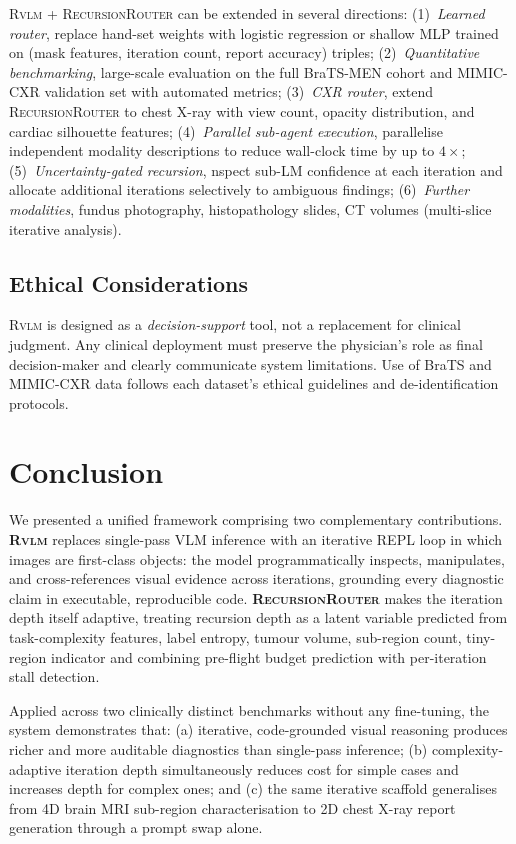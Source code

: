 \documentclass{article}
\newcommand{\RVLM}{\textsc{Rvlm}}
\newcommand{\RRouter}{\textsc{RecursionRouter}}
\begin{document}
	\RVLM{} + \RRouter{} can be extended in several directions:
	(1)~\emph{Learned router}, replace hand-set weights with logistic
	regression or shallow MLP trained on (mask features, iteration count, report
	accuracy) triples;
	(2)~\emph{Quantitative benchmarking}, large-scale evaluation on the full
	BraTS-MEN cohort and MIMIC-CXR validation set with automated metrics;
	(3)~\emph{CXR router}, extend \RRouter{} to chest X-ray with view count,
	opacity distribution, and cardiac silhouette features;
	(4)~\emph{Parallel sub-agent execution}, parallelise independent modality
	descriptions to reduce wall-clock time by up to $4\times$;
	(5)~\emph{Uncertainty-gated recursion}, nspect sub-LM confidence at each
	iteration and allocate additional iterations selectively to ambiguous findings;
	(6)~\emph{Further modalities}, fundus photography, histopathology slides,
	CT volumes (multi-slice iterative analysis).
	
	\subsection{Ethical Considerations}
	
	\RVLM{} is designed as a \emph{decision-support} tool, not a replacement for
	clinical judgment.
	Any clinical deployment must preserve the physician's role as final
	decision-maker and clearly communicate system limitations.
	Use of BraTS and MIMIC-CXR data follows each dataset's ethical guidelines
	and de-identification protocols.
	
	
	\section{Conclusion}
	\label{sec:conclusion}
	
	We presented a unified framework comprising two complementary contributions.
	\textbf{\RVLM{}} replaces single-pass VLM inference with an iterative REPL
	loop in which images are first-class objects: the model programmatically
	inspects, manipulates, and cross-references visual evidence across iterations,
	grounding every diagnostic claim in executable, reproducible code.
	\textbf{\RRouter{}} makes the iteration depth itself adaptive, treating
	recursion depth as a latent variable predicted from task-complexity features, label entropy, tumour volume, sub-region count, tiny-region indicator and combining pre-flight budget prediction with per-iteration stall detection.
	
	Applied across two clinically distinct benchmarks without any fine-tuning,
	the system demonstrates that: (a) iterative, code-grounded visual reasoning
	produces richer and more auditable diagnostics than single-pass inference;
	(b) complexity-adaptive iteration depth simultaneously reduces cost for
	simple cases and increases depth for complex ones; and (c) the same iterative
	scaffold generalises from 4D brain MRI sub-region characterisation to 2D
	chest X-ray report generation through a prompt swap alone.
	
\end{document}
